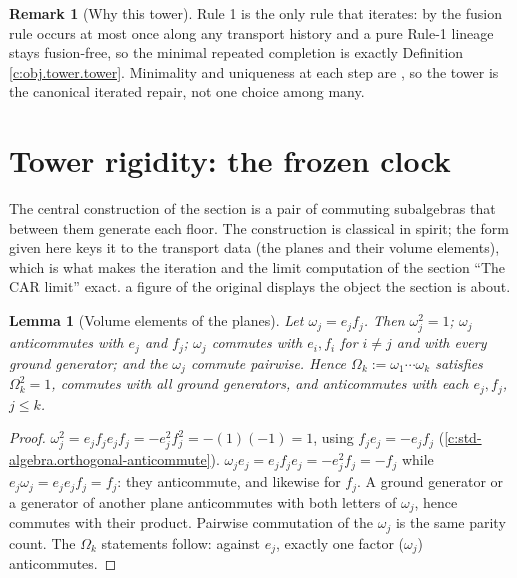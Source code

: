 \documentclass[11pt]{article}
\newtheorem{lemma}[theorem]{Lemma}
\theoremstyle{definition}
\newtheorem{remark}[theorem]{Remark}
\theoremstyle{plain}
\begin{document}
\begin{remark}[Why this tower]\label{c:note.tower.why-tower}
Rule 1 is the only rule that iterates: by \cite[Prop.~7.4]{ButlerT1} the fusion rule occurs at most once along any transport history and a pure Rule-1 lineage stays fusion-free, so the minimal repeated completion is exactly Definition \ref{c:obj.tower.tower}. Minimality and uniqueness at each step are \cite[Thm.~4.13]{ButlerT1}, so the tower is the canonical iterated repair, not one choice among many.
\end{remark}

\section{Tower rigidity: the frozen clock}

\label{c:note.tower.setting-tower-rigidity-frozen-clock}
The central construction of the section is a pair of commuting subalgebras that between them generate each floor. The construction is classical in spirit; the form given here keys it to the transport data (the planes and their volume elements), which is what makes the iteration and the limit computation of the section ``The CAR limit'' exact. a figure of the original displays the object the section is about.

\begin{lemma}[Volume elements of the planes]\label{c:tower.volume-elements-planes}
Let $\omega_j = e_j f_j$. Then $\omega_j^2 = 1$; $\omega_j$ anticommutes with $e_j$ and $f_j$; $\omega_j$ commutes with $e_i, f_i$ for $i \neq j$ and with every ground generator; and the $\omega_j$ commute pairwise. Hence $\Omega_k := \omega_1 \cdots \omega_k$ satisfies $\Omega_k^2 = 1$, commutes with all ground generators, and anticommutes with each $e_j, f_j$, $j \leq k$.
\end{lemma}
\begin{proof}
$\omega_j^2 = e_j f_j e_j f_j = -e_j^2 f_j^2 = -(1)(-1) = 1$, using $f_j e_j = -e_j f_j$ (\ref{c:std-algebra.orthogonal-anticommute}). $\omega_j e_j = e_j f_j e_j = -e_j^2 f_j = -f_j$ while $e_j \omega_j = e_j e_j f_j = f_j$: they anticommute, and likewise for $f_j$. A ground generator or a generator of another plane anticommutes with both letters of $\omega_j$, hence commutes with their product. Pairwise commutation of the $\omega_j$ is the same parity count. The $\Omega_k$ statements follow: against $e_j$, exactly one factor ($\omega_j$) anticommutes.

\end{proof}
\end{document}
